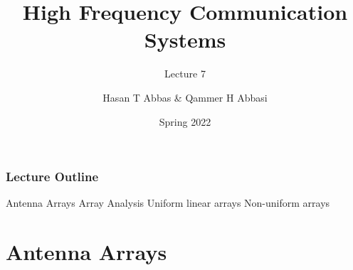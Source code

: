 \documentclass[10pt]{beamer}
\title{High Frequency Communication Systems}
\subtitle{Lecture 7}
\date{Spring 2022}
\author{Hasan T Abbas \& Qammer H Abbasi}
\begin{document}
\maketitle

\begin{frame}[fragile]
    \frametitle{Lecture Outline}
    \begin{outline}[itemize]
        \1 Antenna Arrays
        \1 Array Analysis
        \2 Uniform linear arrays 
        \2 Non-uniform arrays
    \end{outline}
\end{frame}

\section{Antenna Arrays}
\end{document}
